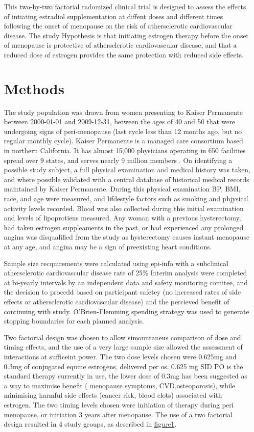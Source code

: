 \documentclass[11pt]{article}
\begin{document}
		This two-by-two factorial radomized clinical trial is designed to assess the effects of intiating estradiol supplementation at diffent doses and different times following the onset of menopause on the risk of athersclerotic cardiovascular disease.
		The study Hypothesis is that initiating estrogen therapy before the onset of menopause is protective of athersclerotic cardiovascular disease, and that a reduced dose of estrogen provides the same protection with reduced side effects.


	\section{Methods} 
		The study population was drawn from women presenting to Kaiser Permanente between 2000-01-01 and 2009-12-31, between the ages of 40 and 50 that were undergoing signs of peri-menopause (last cycle less than 12 months ago, but no regular monthly cycle).
		Kaiser Permanente is a managed care consortium based in northern California. It has almost 15,000 physicians operating in 650 facilities spread over 9 states, and serves nearly 9 million members \cite{Rauber}.
		On identifying a possible study subject, a full physical examination and medical history was taken, and where possible validated with a central database of historical medical records maintained by Kaiser Permanente.
		During this physical examination BP, BMI, race, and age were measured, and lifdestyle factors such as smoking and phjysical activity levels recorded.
		Blood was also collected during this initial examination and levels of lipoprotiens measured.
		Any woman with a previous hysterectomy, had taken estrogen suppleaments in the past, or had experienced any prolonged angina was disqualified from the study as hysterectomy causes instant menopause at any age, and angina may be a sign of preexisting heart conditions.
		

		Sample size recquirements were calculated using epi-info with a subclinical athersclerotic cardiovascular disease rate of 25\%
		Interim analysis were completed at bi-yearly intervals by an independent data and safety monitoring comitee, and the decision to procedd based on participant safetey (no increased rates of side effects or athersclerotic cardiovascular disease) and the percieved benefit of continuing with study.
		O’Brien-Flemming spending strategy was used to generate stopping boundaries for each planned analysis.


		Two factorial design was chosen to allow simountaneus comparison of dose and timing effects, and the use of a very large sample size allowed the assessment of interactions at sufficeint power. 
		The two dose levels chosen were 0.625mg and 0.3mg of conjugated equine estrogens, delivered per os.
		0.625 mg SID PO is the standard therapy currently in use, the lower dose of 0.3mg has been suggested as a way to maximise benefit ( menopause symptoms, CVD,osteoporosis), while minimising harmful side effects (cancer risk, blood clots)  associated with estrogen.
		The two timing levels chosen were initiation of therapy during peri menopause, or initiation 3 years after menopause.
		The use of a two factorial design resulted in 4 study groups, as described in \hyperref[Figure 1]{figure1}.
\end{document}
